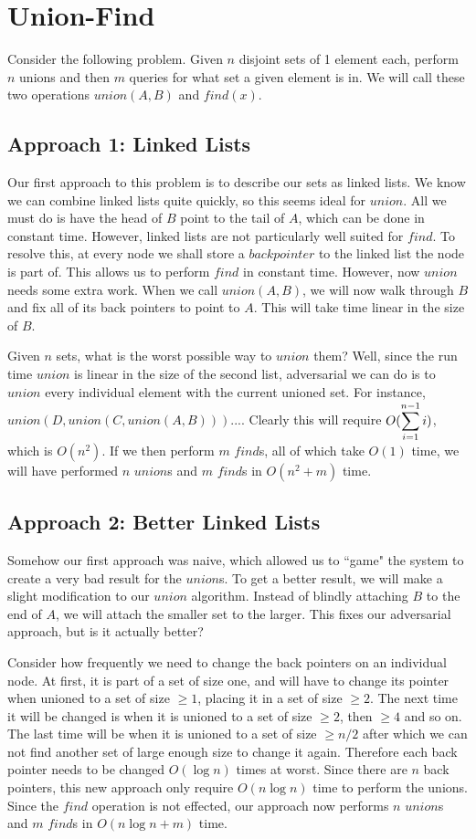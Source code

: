 \chapter{Union-Find}

Consider the following problem. Given $n$ disjoint sets of 1 element each,
perform $n$ unions and then $m$ queries for what set a given element is in.
We will call these two operations $union(A,B)$ and $find(x)$. 

\section{Approach 1: Linked Lists}
Our first
approach to this problem is to describe our sets as linked lists. We know
we can combine linked lists quite quickly, so this seems ideal for $union$. 
All we must do is have the head of $B$ point to the tail of $A$, which can be
done in constant time.
However, linked lists are not particularly well suited for $find$. To resolve
this, at every node we shall store a $back pointer$ to the linked list 
the node is part of. This allows us to perform $find$ in constant time. 
However, now $union$ needs some extra work.
When we call $union(A,B)$, we will now walk through $B$ and fix all of its
back pointers to point to $A$. This will take time linear in the size of $B$.

Given $n$ sets, what is the worst possible way to $union$ them? Well, since
the run time $union$ is linear in the size of the second list, adversarial
we can
do is to $union$ every individual element with the current unioned set. For
instance, $union(D,union(C,union(A,B)))...$. Clearly this will require
$O(\displaystyle\sum\limits_{i=1}^{n-1}i)$, which is $O(n^2)$. If we then perform $m$ $find$s, all
of which take $O(1)$ time, we will have performed $n$ $union$s and $m$ $find$s
in $O(n^2 + m)$ time.

\section{Approach 2: Better Linked Lists}
Somehow our first approach was naive, which allowed us to ``game" the system
to create a very bad result for the $union$s. To get a better result, we will
make a slight modification to our $union$ algorithm. Instead of blindly
attaching $B$ to the end of $A$, we will attach the smaller set to the larger.
This fixes our adversarial approach, but is it actually better? 

Consider how frequently we need to change the back pointers on an individual
node. At first, it is part of a set of size one, and will have to change its
pointer when unioned to a set of size $\geq 1$, placing it in a set
of size $\geq 2$. The next time it will be changed is when it is unioned
to a set of size $\geq 2$, then $\geq 4$ and so on. The last time will be
when it is unioned to a set of size $\geq n/2$ after which we can not find
another set of large enough size to change it again. Therefore each
back pointer needs to be changed $O(\log n)$ times at worst. Since there
are $n$ back pointers, this new approach only require $O(n \log n)$
time to perform the unions. Since the $find$ operation is not effected,
our approach now performs $n$ $union$s and $m$ $find$s
in $O(n \log n + m)$ time.


